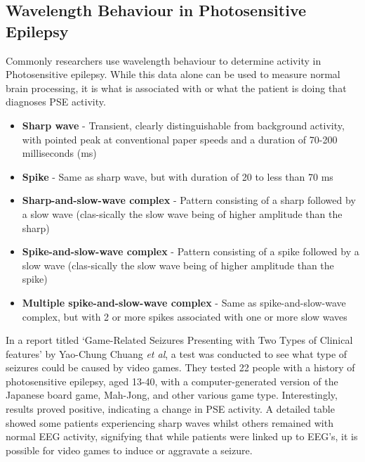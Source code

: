 \documentclass[twocolumn, 10pt, conference]{ieeetran}
\begin{document}
\subsection{Wavelength Behaviour in Photosensitive Epilepsy}
Commonly researchers use wavelength behaviour to determine activity in Photosensitive epilepsy. While this data alone can be used to measure normal brain processing, it is what is associated with or what the patient is doing that diagnoses PSE activity.
\begin{itemize}
	\item \textbf{Sharp wave} - Transient, clearly distinguishable from background activity, with pointed peak at conventional paper speeds and a duration of 70-200 milliseconds (ms)
	\item \textbf{Spike} - Same as sharp wave, but with duration of 20 to less than 70 ms
	\item \textbf{Sharp-and-slow-wave complex} - Pattern consisting of a sharp followed by a slow wave (clas-sically the slow wave being of higher amplitude than the sharp)
	\item \textbf{Spike-and-slow-wave complex} - Pattern consisting of a spike followed by a slow wave (clas-sically the slow wave being of higher amplitude than the spike)
	\item \textbf{Multiple spike-and-slow-wave complex} - Same as spike-and-slow-wave complex, but with 2 or more spikes associated with one or more slow waves
\end{itemize}
In a report titled ‘Game-Related Seizures Presenting with Two Types of Clinical features’ by Yao-Chung Chuang \cite{chuang2006game} \textit{et al}, a test was conducted to see what type of seizures could be caused by video games. They tested 22 people with a history of photosensitive epilepsy, aged 13-40, with a computer-generated version of the Japanese board game, Mah-Jong, and other various game type. Interestingly, results proved positive, indicating a change in PSE activity. A detailed table showed some patients experiencing sharp waves whilst others remained with normal EEG activity, signifying that while patients were linked up to EEG’s, it is possible for video games to induce or aggravate a seizure.
\end{document}
